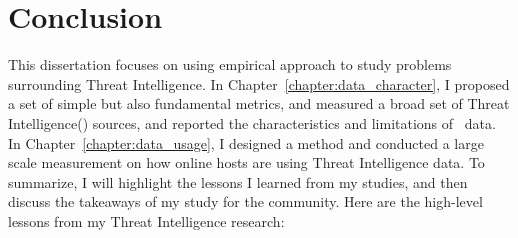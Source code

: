 \chapter{Conclusion}
\label{chapter:conclusion}

This dissertation focuses on using empirical approach to study 
problems surrounding Threat Intelligence. 
In Chapter~\ref{chapter:data_character}, I proposed 
a set of simple but also fundamental metrics, and measured a broad
set of Threat Intelligence(\ti) sources, and reported the 
characteristics and limitations of \ti\ data. In 
Chapter~\ref{chapter:data_usage}, I designed a method and conducted 
a large scale measurement on how online hosts are using Threat 
Intelligence data. To summarize, I will highlight the lessons I 
learned from my studies, and then discuss the takeaways of my
study for the community. Here are the high-level lessons from my 
Threat Intelligence research:

